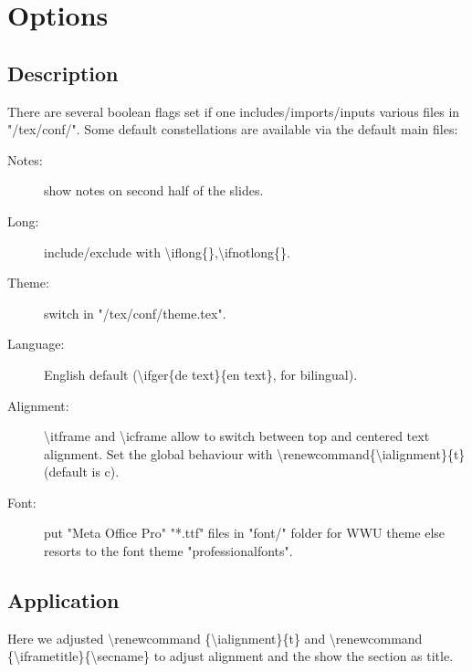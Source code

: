 
\section{Options}
\subsection{Description}
\begin{iframe}
There are several boolean flags set if one includes/imports/inputs various files in "/tex/conf/". Some default constellations are available via the default main files:

\begin{description}
\item[Notes:] show notes on second half of the slides.
\item[Long:] include/exclude with \textbackslash iflong\{\},\textbackslash ifnotlong\{\}.
\item[Theme:] switch in "/tex/conf/theme.tex".
\item[Language:] English default (\textbackslash ifger\{de text\}\{en text\}, for bilingual).
\item[Alignment:] \textbackslash itframe and \textbackslash icframe allow to switch between top and centered text alignment. Set the global behaviour with \textbackslash renewcommand\{\textbackslash ialignment\}\{t\} (default is c).
\item[Font:] put "Meta Office Pro" "*.ttf" files in "font/" folder for WWU theme else resorts to the font theme "professionalfonts".
\end{description}
\end{iframe}

\subsection{Application}
\begingroup
\renewcommand{\ialignment}{t}
\renewcommand{\iframetitle}{\secname}
\begin{iframe}[-10pt]
	Here we adjusted \textbackslash renewcommand \{\textbackslash ialignment\}\{t\} and  \textbackslash renewcommand \{\textbackslash iframetitle\}\{\textbackslash secname\} to adjust alignment and the show the section as title.
\end{iframe}
\endgroup